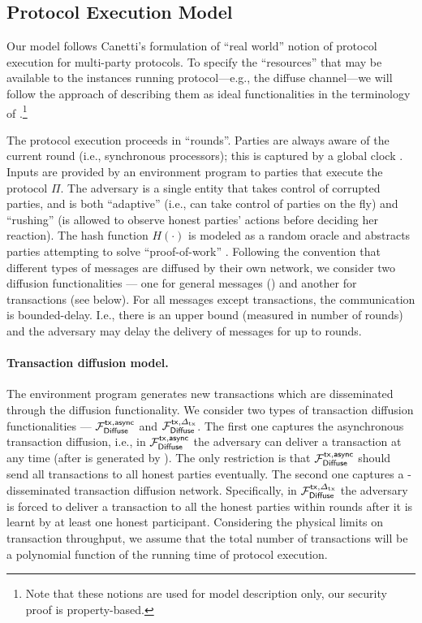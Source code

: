 \subsection{Protocol Execution Model}
\label{subsec:protocol-execution-model}

Our model follows Canetti's formulation of ``real world'' notion of protocol execution \cite{JC:Canetti00,EPRINT:Canetti00} for multi-party protocols.
%
To specify the ``resources'' that may be available to the instances running protocol---e.g., the diffuse channel---we will follow the approach of describing them as ideal functionalities in the terminology of \cite{EPRINT:Canetti00}.\footnote{Note that these notions are used for model description only, our security proof is property-based.}

The protocol execution proceeds in ``rounds''.
%
Parties are always aware of the current round (i.e., synchronous processors); this is captured by a global clock \funcClock \cite{TCC:KMTZ13}.
%
Inputs are provided by an environment program \Z to parties that execute the protocol $\Pi$.
%
The adversary \adv is a single entity that takes control of corrupted parties, and is both ``adaptive'' (i.e., \adv can take control of parties on the fly) and ``rushing'' (\adv is allowed to observe honest parties' actions before deciding her reaction).
%
The hash function $H(\cdot)$ is modeled as a random oracle \funcRO and abstracts parties attempting to solve ``proof-of-work'' \cite{C:DwoNao92}.
%
Following the convention that different types of messages are diffused by their own network, we consider two diffusion functionalities --- one for general messages (\funcDiffuse) and another for transactions (see below).
%
For all messages except transactions, the communication is bounded-delay.
%
I.e., there is an upper bound \delay (measured in number of rounds) and the adversary may delay the delivery of messages for up to \delay rounds.

\paragraph{Transaction diffusion model.}
%
The environment program \Z generates new transactions which are disseminated through the diffusion functionality.
%
We consider two types of transaction diffusion functionalities --- $\mathcal{F}_{\textsf{Diffuse}}^{\mathsf{tx}, \mathsf{async}}$ and $\mathcal{F}_{\textsf{Diffuse}}^{\mathsf{tx}, \varDelta_{\mathrm{tx}}}$.
%
The first one captures the asynchronous transaction diffusion, i.e., in $\mathcal{F}_{\textsf{Diffuse}}^{\mathsf{tx}, \mathsf{async}}$ the adversary can deliver a transaction \tx at any time (after \tx is generated by \Z).
%
The only restriction is that $\mathcal{F}_{\textsf{Diffuse}}^{\mathsf{tx}, \mathsf{async}}$ should send all transactions to all honest parties eventually.
%
The second one captures a \txDelay-disseminated transaction diffusion network.
%
Specifically, in $\mathcal{F}_{\textsf{Diffuse}}^{\mathsf{tx}, \varDelta_{\mathrm{tx}}}$ the adversary is forced to deliver a transaction to all the honest parties within \txDelay rounds after it is learnt by at least one honest participant.
%
Considering the physical limits on transaction throughput, we assume that the total number of transactions will be a polynomial function of the running time of protocol execution.

